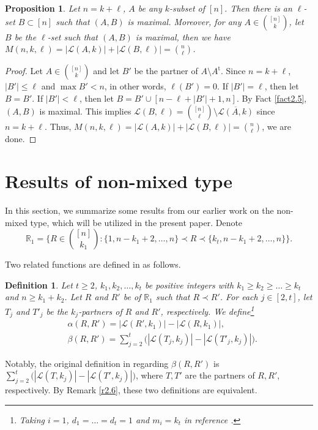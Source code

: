 \documentclass[a4paper,11pt]{article}
\newtheorem{definition}[theorem]{Definition}
\newtheorem{proposition}[theorem]{Proposition}
\begin{document}
\begin{proposition}\label{5-13-1}
Let $n=k+\ell$, $A$ be any $k$-subset of $[n]$. Then there is an $\ell$-set $B\subset [n]$ such that $(A, B)$ is maximal. Moreover, for any $A\in {[n]\choose k}$, let $B$ be the $\ell$-set such that $(A, B)$ is maximal, then we have $M(n, k, \ell)=|\mathcal{L}(A, k)|+|\mathcal{L}(B, \ell)|={n\choose \ell}$.
\end{proposition}

\begin{proof}
Let $A\in {[n]\choose k}$ and let $B'$ be the partner of $A\setminus A^{\mathrm{t}}$.  Since $n=k+\ell$, $|B'|\leq \ell$ and $\max B'<n$, in other words, $\ell(B')=0$.  If $|B'|=\ell$, then let $B=B'$. If $|B'|<\ell$, then let $B=B'\cup [n-\ell+|B'|+1, n]$. By Fact \ref{fact2.5}, $(A, B)$ is maximal. This implies
$\mathcal{L}(B, \ell)={[n]\choose \ell}\setminus \overline{\mathcal{L}(A, k)}$
since $n=k+\ell$. Thus, $M(n, k, \ell)=|\mathcal{L}(A, k)|+|\mathcal{L}(B, \ell)|={n\choose \ell}$, we are done.
\end{proof}


\section{Results of non-mixed type}\label{sec4}
In this section, we summarize some  results from our earlier work \cite{HP+} on the non-mixed type, which will be utilized in the present paper.
Denote
\begin{equation*}
\mathbb{R}_1=\Big\{ R\in {[n]\choose k_1}:\{1, n-k_1+2, \dots, n\}\prec R\prec \{k_{t}, n-k_1+2, \dots, n\}\Big\}.
\end{equation*}


  Two related functions are defined in \cite{HP+} as follows.

\begin{definition}\label{ab-}
Let $t\geq 2$, $k_1, k_2, \dots, k_{t}$ be positive integers with $k_1\geq k_2\geq \dots \geq k_{t}$ and $n\geq k_1+k_2$.
Let $R$ and $R'$  be of  $\mathbb{R}_1$ such that $R\prec R'$.
For each $j\in [2, t]$,
 let $T_j$ and $T'_j$ be the $k_j$-partners of $R$ and $R'$, respectively. We  define\footnote{Taking $i=1$, $d_1=\dots=d_t=1$ and $m_i=k_t$  in reference \cite[eq. (16) and (17)]{HP+}.}
\begin{align}\label{eq6}
&\alpha(R, R')=|\mathcal{L}(R', k_1)|-|\mathcal{L}(R, k_1)|,\\ \label{eq7}
&\beta(R, R')=\sum_{j=2}^t\big(|\mathcal{L}(T_j, k_j)|-|\mathcal{L}(T'_j, k_j)|\big).
\end{align}
\end{definition}
Notably,   the original definition in \cite{HP+}  regarding $\beta(R, R')$ is
 $\sum_{j=2}^t\big(|\mathcal{L}(T, k_j)|-|\mathcal{L}(T', k_j)|\big)$, where $T, T'$ are the partners of $R, R'$, respectively. By Remark \ref{r2.6}, these two definitions are equivalent.
\end{document}
